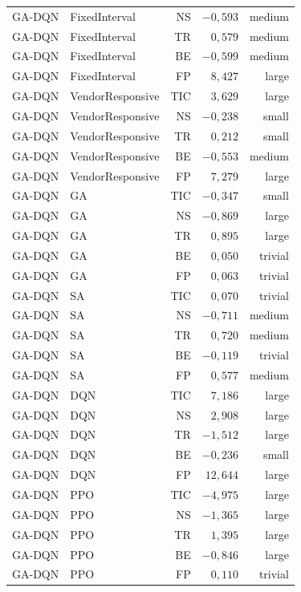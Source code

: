 \begin{table}[htb]
\begin{tabular}{llrrr}
GA-DQN & FixedInterval & NS & $-0{,}593$ & medium \\
GA-DQN & FixedInterval & TR & $0{,}579$ & medium \\
GA-DQN & FixedInterval & BE & $-0{,}599$ & medium \\
GA-DQN & FixedInterval & FP & $8{,}427$ & large \\
GA-DQN & VendorResponsive & TIC & $3{,}629$ & large \\
GA-DQN & VendorResponsive & NS & $-0{,}238$ & small \\
GA-DQN & VendorResponsive & TR & $0{,}212$ & small \\
GA-DQN & VendorResponsive & BE & $-0{,}553$ & medium \\
GA-DQN & VendorResponsive & FP & $7{,}279$ & large \\
GA-DQN & GA & TIC & $-0{,}347$ & small \\
GA-DQN & GA & NS & $-0{,}869$ & large \\
GA-DQN & GA & TR & $0{,}895$ & large \\
GA-DQN & GA & BE & $0{,}050$ & trivial \\
GA-DQN & GA & FP & $0{,}063$ & trivial \\
GA-DQN & SA & TIC & $0{,}070$ & trivial \\
GA-DQN & SA & NS & $-0{,}711$ & medium \\
GA-DQN & SA & TR & $0{,}720$ & medium \\
GA-DQN & SA & BE & $-0{,}119$ & trivial \\
GA-DQN & SA & FP & $0{,}577$ & medium \\
GA-DQN & DQN & TIC & $7{,}186$ & large \\
GA-DQN & DQN & NS & $2{,}908$ & large \\
GA-DQN & DQN & TR & $-1{,}512$ & large \\
GA-DQN & DQN & BE & $-0{,}236$ & small \\
GA-DQN & DQN & FP & $12{,}644$ & large \\
GA-DQN & PPO & TIC & $-4{,}975$ & large \\
GA-DQN & PPO & NS & $-1{,}365$ & large \\
GA-DQN & PPO & TR & $1{,}395$ & large \\
GA-DQN & PPO & BE & $-0{,}846$ & large \\
GA-DQN & PPO & FP & $0{,}110$ & trivial \\
\bottomrule
\end{tabular}
\end{table}